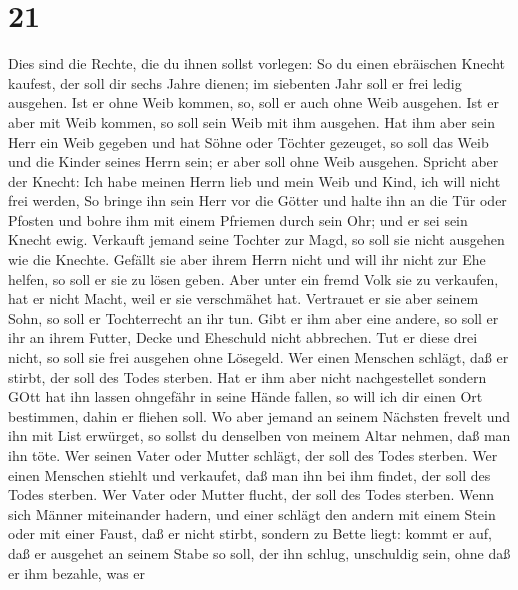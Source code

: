 \hypertarget{section-20}{%
\section{21}\label{section-20}}

 Dies sind die Rechte, die du ihnen sollst vorlegen:
 So du einen ebräischen Knecht kaufest, der soll dir sechs
Jahre dienen; im siebenten Jahr soll er frei ledig ausgehen.
 Ist er ohne Weib kommen, so, soll er auch ohne Weib
ausgehen. Ist er aber mit Weib kommen, so soll sein Weib mit ihm
ausgehen.  Hat ihm aber sein Herr ein Weib gegeben und hat
Söhne oder Töchter gezeuget, so soll das Weib und die Kinder seines
Herrn sein; er aber soll ohne Weib ausgehen.  Spricht aber
der Knecht: Ich habe meinen Herrn lieb und mein Weib und Kind, ich will
nicht frei werden,  So bringe ihn sein Herr vor die Götter
und halte ihn an die Tür oder Pfosten und bohre ihm mit einem Pfriemen
durch sein Ohr; und er sei sein Knecht ewig.  Verkauft
jemand seine Tochter zur Magd, so soll sie nicht ausgehen wie die
Knechte.  Gefällt sie aber ihrem Herrn nicht und will ihr
nicht zur Ehe helfen, so soll er sie zu lösen geben. Aber unter ein
fremd Volk sie zu verkaufen, hat er nicht Macht, weil er sie verschmähet
hat.  Vertrauet er sie aber seinem Sohn, so soll er
Tochterrecht an ihr tun.  Gibt er ihm aber eine andere, so
soll er ihr an ihrem Futter, Decke und Eheschuld nicht abbrechen.
 Tut er diese drei nicht, so soll sie frei ausgehen ohne
Lösegeld.  Wer einen Menschen schlägt, daß er stirbt, der
soll des Todes sterben.  Hat er ihm aber nicht
nachgestellet sondern GOtt hat ihn lassen ohngefähr in seine Hände
fallen, so will ich dir einen Ort bestimmen, dahin er fliehen soll.
 Wo aber jemand an seinem Nächsten frevelt und ihn mit List
erwürget, so sollst du denselben von meinem Altar nehmen, daß man ihn
töte.  Wer seinen Vater oder Mutter schlägt, der soll des
Todes sterben.  Wer einen Menschen stiehlt und verkaufet,
daß man ihn bei ihm findet, der soll des Todes sterben. 
Wer Vater oder Mutter flucht, der soll des Todes sterben. 
Wenn sich Männer miteinander hadern, und einer schlägt den andern mit
einem Stein oder mit einer Faust, daß er nicht stirbt, sondern zu Bette
liegt:  kommt er auf, daß er ausgehet an seinem Stabe so
soll, der ihn schlug, unschuldig sein, ohne daß er ihm bezahle, was er
